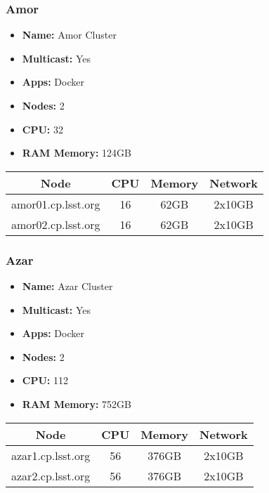 \subsubsection{Amor}
\begin{itemize}
  \itemsep0em 
  \item \textbf{Name:}       Amor Cluster
  \item \textbf{Multicast:}  Yes
  \item \textbf{Apps:}       Docker
  \item \textbf{Nodes:}      2
  \item \textbf{CPU:}        32
  \item \textbf{RAM Memory:} 124GB
\end{itemize}
\begin{center}
  \small
  \begin{tabular}{||c c c c||}
    \hline
    \textbf{Node} & \textbf{CPU} & \textbf{Memory} & \textbf{Network} \\ [0.5ex]
    \hline
    amor01.cp.lsst.org & 16 & 62GB & 2x10GB \\
    \hline
    amor02.cp.lsst.org & 16 & 62GB & 2x10GB \\
    \hline
  \end{tabular}
\end{center}

\subsubsection{Azar}
\begin{itemize}
  \itemsep0em 
  \item \textbf{Name:}       Azar Cluster
  \item \textbf{Multicast:}  Yes
  \item \textbf{Apps:}       Docker
  \item \textbf{Nodes:}      2
  \item \textbf{CPU:}        112
  \item \textbf{RAM Memory:} 752GB
\end{itemize}
\begin{center}
  \small
  \begin{tabular}{||c c c c||}
    \hline
    \textbf{Node} & \textbf{CPU} & \textbf{Memory} & \textbf{Network} \\ [0.5ex]
    \hline
    azar1.cp.lsst.org & 56 & 376GB & 2x10GB \\
    \hline
    azar2.cp.lsst.org & 56 & 376GB & 2x10GB \\
    \hline
  \end{tabular}
\end{center}

